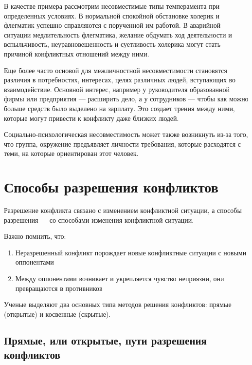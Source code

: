 \documentclass[a4paper,14pt]{extarticle}
\begin{document}
В качестве примера рассмотрим несовместимые типы темперамента при определенных условиях. В нормальной спокойной    обстановке холерик и флегматик успешно справляются с порученной им работой. В аварийной ситуации медлительность флегматика, желание обдумать ход деятельности и вспыльчивость, неуравновешенность и суетливость холерика могут стать причиной конфликтных отношений между ними.

Еще более часто основой для межличностной несовместимости становятся различия в потребностях, интересах, целях  различных людей, вступающих во взаимодействие. Основной интерес, например у руководителя образованной фирмы или предприятия — расширить дело, а у сотрудников  — чтобы как можно больше средств было выделено на зарплату. Это создает трения между ними, которые могут привести к конфликту даже близких людей.

Социально-психологическая несовместимость может также возникнуть из-за того, что группа, окружение предъявляет личности требования, которые расходятся с теми, на которые ориентирован этот человек.

\pagebreak
\section{Способы разрешения конфликтов}

Разрешение конфликта связано с изменением конфликтной ситуации, а способы разрешения — со способами изменения конфликтной ситуации.

Важно помнить, что:

\begin{enumerate}
    \item Неразрешенный конфликт порождает новые конфликтные ситуации с новыми оппонентами
    \item Между оппонентами возникает и укрепляется чувство неприязни, они превращаются в противников
\end{enumerate}

Ученые выделяют два основных типа методов решения конфликтов: прямые (открытые) и косвенные (скрытые).

\subsection{Прямые, или открытые, пути разрешения конфликтов}
\end{document}
